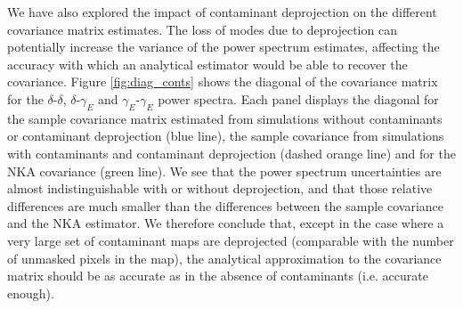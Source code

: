 \documentclass[a4paper,11pt]{article}
\begin{document}
      We have also explored the impact of contaminant deprojection on the different covariance matrix estimates. The loss of modes due to deprojection can potentially increase the variance of the power spectrum estimates, affecting the accuracy with which an analytical estimator would be able to recover the covariance. Figure \ref{fig:diag_conts} shows the diagonal of the covariance matrix for the $\delta$-$\delta$,      $\delta$-$\gamma_E$ and $\gamma_E$-$\gamma_E$ power spectra. Each panel displays the diagonal for the sample covariance matrix estimated from simulations without contaminants or contaminant deprojection (blue
      line), the sample covariance from simulations with contaminants and contaminant deprojection (dashed orange line) and for the NKA covariance   (green line). We see that the power spectrum uncertainties are almost indistinguishable with or without deprojection, and that those relative differences are much smaller than the differences between the sample covariance and the NKA estimator. We therefore conclude that, except in the case where a very large set of contaminant maps are deprojected (comparable with the number of unmasked pixels in the map), the analytical approximation to the covariance matrix should be as accurate as in the absence of contaminants (i.e. accurate enough).
\end{document}
